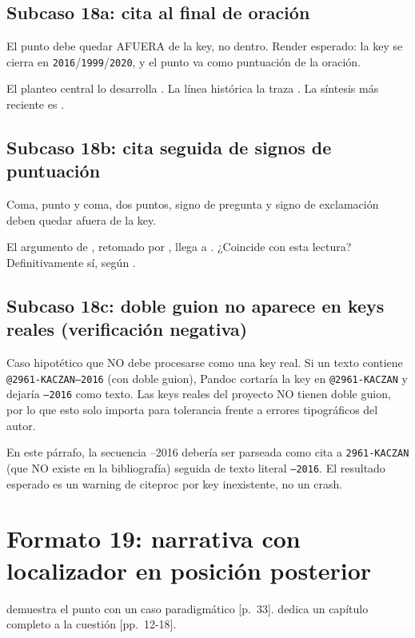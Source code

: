 \subsection{Subcaso 18a: cita al final de oración}
El punto debe quedar AFUERA de la key, no dentro. Render esperado: la key se cierra en \texttt{2016}/\texttt{1999}/\texttt{2020}, y el punto va como puntuación de la oración.

El planteo central lo desarrolla \textcite{2961-KACZAN2016}. La línea histórica la traza \textcite{3041-PINEAU1999}. La síntesis más reciente es \textcite{3036-ORBUCH2020}.


\subsection{Subcaso 18b: cita seguida de signos de puntuación}
Coma, punto y coma, dos puntos, signo de pregunta y signo de exclamación deben quedar afuera de la key.

El argumento de \textcite{2961-KACZAN2016}, retomado por \textcite{3041-PINEAU1999}, llega a \textcite{3036-ORBUCH2020}. ¿Coincide \textcite{2961-KACZAN2016} con esta lectura? Definitivamente sí, según \textcite{3036-ORBUCH2020}.


\subsection{Subcaso 18c: doble guion no aparece en keys reales (verificación negativa)}
Caso hipotético que NO debe procesarse como una key real. Si un texto contiene \texttt{@2961-KACZAN--2016} (con doble guion), Pandoc cortaría la key en \texttt{@2961-KACZAN} y dejaría \texttt{--2016} como texto. Las keys reales del proyecto NO tienen doble guion, por lo que esto solo importa para tolerancia frente a errores tipográficos del autor.

En este párrafo, la secuencia \textcite{2961-KACZAN}–2016 debería ser parseada como cita a \texttt{2961-KACZAN} (que NO existe en la bibliografía) seguida de texto literal \texttt{--2016}. El resultado esperado es un warning de citeproc por key inexistente, no un crash.



\section{Formato 19: narrativa con localizador en posición posterior}
\textcite{2961-KACZAN2016} demuestra el punto con un caso paradigmático [p. 33]. \textcite{3036-ORBUCH2020} dedica un capítulo completo a la cuestión [pp. 12-18].


